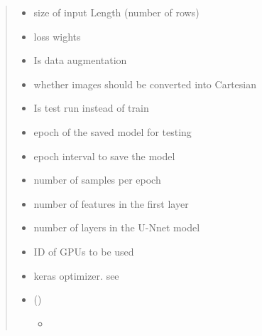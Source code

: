 \documentclass[letterpaper,10pt,english]{sphinxmanual}
\begin{document}
\begin{fulllineitems}
\begin{quote}
\begin{description}
\begin{itemize}
\item {} 
 \textendash{} size of input Length (number of rows)

\item {} 
 \textendash{} loss wights

\item {} 
 \textendash{} Is data augmentation

\item {} 
 \textendash{} whether images should be converted into Cartesian

\item {} 
 \textendash{} Is test run instead of train

\item {} 
 \textendash{} epoch of the saved model for testing

\item {} 
 \textendash{} epoch interval to save the model

\item {} 
 \textendash{} number of samples per epoch

\item {} 
 \textendash{} number of features in the first layer

\item {} 
 \textendash{} number of layers in the U-Nnet model

\item {} 
 \textendash{} ID of GPUs to be used

\item {} 
 \textendash{} keras optimizer. see 

\item {} 
 () \textendash{} \begin{itemize}
\item {} 
{\hyperref[\detokenize{index:unet.unet.unet_model}]{}}


\end{itemize}
\end{itemize}
\end{description}
\end{quote}
\end{fulllineitems}
\end{document}
